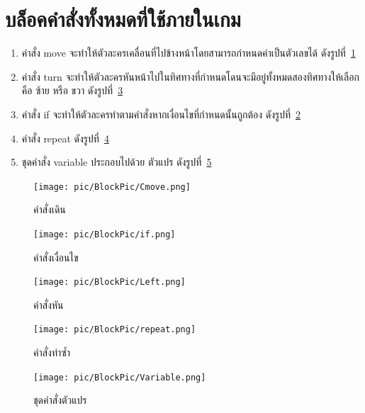 \section{บล็อคคำสั่งทั้งหมดที่ใช้ภายในเกม}
\begin{enumerate}
    \item คำสั่ง move จะทำให้ตัวละครเคลื่อนที่ไปข้างหน้าโดยสามารถกำหนดค่าเป็นตัวเลขได้
    ดังรูปที่~\ref{moveB}
    \item คำสั่ง turn จะทำให้ตัวละครหันหน้าไปในทิศทางที่กำหนดโดนจะมีอยู่ทั้งหมดสองทิศทางให้เลือกคือ ซ้าย หรือ ขวา
    ดังรูปที่~\ref{turnB}
    \item คำสั่ง if จะทำให้ตัวละครทำตามคำสั่งหากเงื่อนไขที่กำหนดนั้นถูกต้อง
    ดังรูปที่~\ref{ifB}
    \item คำสั่ง repeat
    ดังรูปที่~\ref{repeatB}
    \item ชุดคำสั่ง variable ประกอบไปด้วย ตัวแปร 
    ดังรูปที่~\ref{variableB}
\end{enumerate}
\begin{figure}[H]
    \begin{center}
        \texttt{[image: pic/ฺBlockPic/Cmove.png]}
    \end{center}
    \caption[คำสั่งเดิน]{คำสั่งเดิน}
    \label{moveB}
\end{figure}
\begin{figure}[H]
    \begin{center}
        \texttt{[image: pic/ฺBlockPic/if.png]}
    \end{center}
    \caption[คำสั่งมีเงื่อนไข]{คำสั่งเงื่อนไข}
    \label{ifB}
\end{figure}
\begin{figure}[H]
    \begin{center}
        \texttt{[image: pic/ฺBlockPic/Left.png]}
    \end{center}
    \caption[คำสั่งหัน]{คำสั่งหัน}
    \label{turnB}
\end{figure}
\begin{figure}[H]
    \begin{center}
        \texttt{[image: pic/ฺBlockPic/repeat.png]}
    \end{center}
    \caption[คำสั่งทังซ้ำ]{คำสั่งทำซ้ำ}
    \label{repeatB}
\end{figure}
\begin{figure}[H]
    \begin{center}
        \texttt{[image: pic/ฺBlockPic/Variable.png]}
    \end{center}
    \caption[ชุดคำสั่งตัวแปร]{ชุดคำสั่งตัวแปร}
    \label{variableB}
\end{figure}

